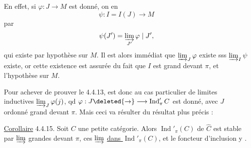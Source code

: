 En effet, si $\varphi:J\longrightarrow M$ est donné, on en 
\[
\psi:I=I(J)\longrightarrow M
\]
par
\[
\psi(J')=\varinjlim_{J'}\varphi\mid J',
\]
qui existe par hypothèse sur $M$. Il est alors immédiat que $\varinjlim_J\varphi$ existe sss $\varinjlim_I\psi$ existe, or cette existence est assurée du fait que $I$ est grand devant $\pi$, et l'hypothèse sur $M$.

Pour achever de prouver le  4.4.13,  est donc  au cas particulier de limites inductives $\varinjlim_J\varphi(j)$, qd $\varphi:J\deleted{\to}\longrightarrow\operatorname{Ind}'_\pi C$ est donné, avec $J$ 
ordonné grand devant $\pi$. Mais ceci va résulter du résultat plus précis :

\uline{Corollaire} 4.4.15. Soit $C$ une petite catégorie. Alors  $\operatorname{Ind}'_\pi(C)$  de $\widehat C$ est stable  par $\varinjlim$ grandes devant $\pi$,    ces $\varinjlim$  \uline{dans $\operatorname{Ind}'_\pi(C)$}, et le foncteur d'inclusion y .

